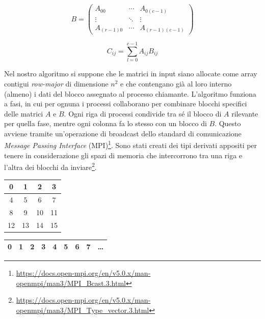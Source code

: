 \documentclass[a4paper]{article}
\begin{document}
$$
    B=
    \begin{pmatrix}
        A_{00}     & \cdots & A_{0(c-1)}     \\
        \vdots     & \ddots & \vdots         \\
        A_{(r-1)0} & \cdots & A_{(r-1)(c-1)}
    \end{pmatrix}
$$

$$
    C_{ij}=\sum_{l=0}^{c-1}A_{ij}B_{ij}
$$

Nel nostro algoritmo si suppone che le matrici in input siano allocate come array contigui \textit{row-major} di dimensione $n^2$ e che contengano già al loro interno (almeno) i dati del blocco assegnato al processo chiamante.
L'algoritmo funziona a fasi, in cui per ognuna i processi collaborano per combinare blocchi specifici delle matrici $A$ e $B$. Ogni riga di processi condivide tra sé il blocco di $A$ rilevante per quella fase, mentre ogni colonna fa lo stesso con un blocco di $B$. Questo avviene tramite un'operazione di broadcast dello standard di comunicazione \textit{Message Passing Interface} (MPI)\footnote{\url{https://docs.open-mpi.org/en/v5.0.x/man-openmpi/man3/MPI_Bcast.3.html}}. Sono stati creati dei tipi derivati appositi per tenere in considerazione gli spazi di memoria che intercorrono tra una riga e l'altra dei blocchi da inviare\footnote{\url{https://docs.open-mpi.org/en/v5.0.x/man-openmpi/man3/MPI_Type_vector.3.html}}.

\begin{table}[h]
    \center
    \begin{tabular}{|c|c|c|c|}
        \hline
        \cellcolor{yellow}0 & \cellcolor{yellow}1 & 2  & 3  \\ \hline
        \cellcolor{yellow}4 & \cellcolor{yellow}5 & 6  & 7  \\ \hline
        8                   & 9                   & 10 & 11 \\ \hline
        12                  & 13                  & 14 & 15 \\ \hline
    \end{tabular}
    \begin{tabular}{|c|c|c|c|c|c|c|c|c}
        \hline
        \cellcolor{yellow}0 & \cellcolor{yellow}1 & 2 & 3 & \cellcolor{yellow}4 & \cellcolor{yellow}5 & 6 & 7 & \dots \\ \hline
    \end{tabular}
\end{table}
\end{document}
